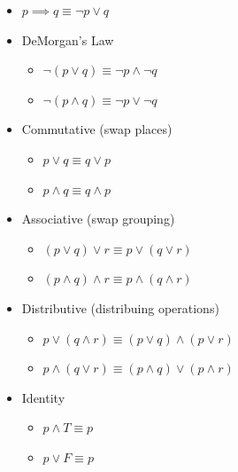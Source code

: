 \documentclass[../../Main.tex]{subfiles}
\begin{document}
\begin{itemize}
    \item $p \implies q \equiv \neg p \lor q$

    \item
    {
        DeMorgan's Law

        \begin{itemize}
            \item $\neg (p \lor q) \equiv \neg p \land \neg q$
            \item $\neg (p \land q) \equiv \neg p \lor \neg q$
        \end{itemize}
    }

    \item 
    {
        Commutative (swap places)

        \begin{itemize}
            \item $p \lor q \equiv q \lor p$
            \item $p \land q \equiv q \land p$
        \end{itemize}
    }

    \item
    {
        Associative (swap grouping)

        \begin{itemize}
            \item $(p \lor q) \lor r \equiv p \lor (q \lor r)$
            \item $(p \land q) \land r \equiv p \land (q \land r)$
        \end{itemize}
    }

    \item
    {
        Distributive (distribuing operations)

        \begin{itemize}
            \item $p \lor (q \land r) \equiv (p \lor q) \land (p \lor r)$
            \item $p \land (q \lor r) \equiv (p \land q) \lor (p \land r)$
        \end{itemize}
    }

    \item
    {
        Identity

        \begin{itemize}
            \item $p \land T \equiv p$
            \item $p \lor F \equiv p$ 
        \end{itemize}
    }


\end{itemize}
\end{document}
